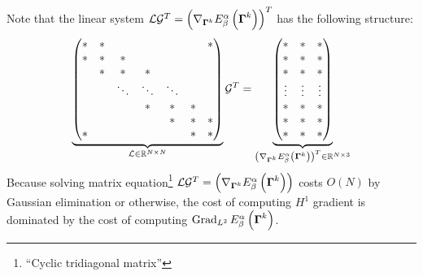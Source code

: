 \documentclass[../dissertation.tex]{subfiles}
\begin{document}
Note that the linear system $\mathcal{L} \mathcal{G}^T = \left( \nabla_{\boldsymbol{\Gamma}^k} E_{\beta}^{\alpha} \left( \boldsymbol{\Gamma}^k \right) \right)^T$ has the following structure:
\begin{equation*}
    \underbrace{
    \begin{pmatrix}
        * & * &   &   &   & & * \\
        * & * & * &   &   & &  \\
          & * & * & * &  &  &   \\
          &   & \ddots  & \ddots & \ddots &  & \\
          &   &   & *  &  * & * & \\
          &  & &  & *  & *  & * \\
        * &   & &  &   & *  & *
    \end{pmatrix}
}_{\mathcal{L} \in \mathbb{R}^{N \times N}}
\mathcal{G}^T
=
\underbrace{
\begin{pmatrix}
    * & * & * \\
    * & * & * \\
    * & * & * \\
    \vdots & \vdots & \vdots \\
    * & * & * \\
    * & * & * \\
    * & * & *
\end{pmatrix}
}_{\left( \nabla_{\boldsymbol{\Gamma}^k} E_{\beta}^{\alpha} \left( \boldsymbol{\Gamma}^k \right) \right)^T \in \mathbb{R}^{N \times 3}}
\end{equation*}
Because solving matrix equation\footnote{``Cyclic tridiagonal matrix''} $\mathcal{L} \mathcal{G}^T = \left( \nabla_{\boldsymbol{\Gamma}^k} E_{\beta}^{\alpha} \left( \boldsymbol{\Gamma}^k \right) \right)$ costs $O \left( N \right)$ by Gaussian elimination or otherwise\cite{10.1145/44164.44165},
the cost of computing $H^1$ gradient is dominated by the cost of computing $\operatorname{Grad}_{L^2} E_{\beta}^{\alpha} \left( \boldsymbol{\Gamma}^k \right)$.
\end{document}
